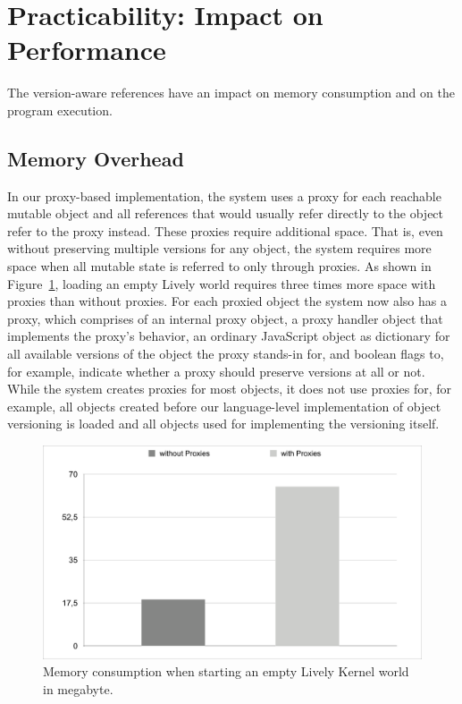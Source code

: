 \section{Practicability: Impact on Performance}

The version-aware references have an impact on memory consumption and on the program execution.

\subsection{Memory Overhead}

In our proxy-based implementation, the system uses a proxy for each reachable mutable object and all references that would usually refer directly to the object refer to the proxy instead.
These proxies require additional space.
That is, even without preserving multiple versions for any object, the system requires more space when all mutable state is referred to only through proxies.
As shown in Figure~\ref{fig:MemoryOverhead}, loading an empty Lively world requires three times more space with proxies than without proxies.
For each proxied object the system now also has a proxy, which comprises of an internal proxy object, a proxy handler object that implements the proxy's behavior, an ordinary JavaScript object as dictionary for all available versions of the object the proxy stands-in for, and boolean flags to, for example, indicate whether a proxy should preserve versions at all or not.
While the system creates proxies for most objects, it does not use proxies for, for example, all objects created before our language-level implementation of object versioning is loaded and all objects used for implementing the versioning itself.

\begin{figure}[h]
    \centering
    \includegraphics[width=\textwidth]{figures/memoryOverhead.pdf}
    \caption{Memory consumption when starting an empty Lively Kernel world in megabyte.}
    \label{fig:MemoryOverhead}
\end{figure}

